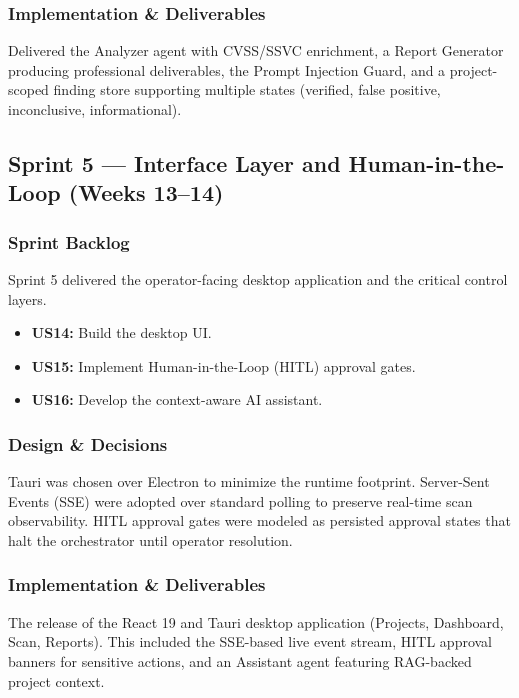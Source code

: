 \documentclass[12pt,a4paper]{report}
\begin{document}
\subsubsection{Implementation \& Deliverables}
Delivered the Analyzer agent with CVSS/SSVC enrichment, a Report Generator producing professional deliverables, the Prompt Injection Guard, and a project-scoped finding store supporting multiple states (verified, false positive, inconclusive, informational).

\subsection{Sprint 5 --- Interface Layer and Human-in-the-Loop (Weeks 13--14)}

\subsubsection{Sprint Backlog}
Sprint 5 delivered the operator-facing desktop application and the critical control layers.
\begin{itemize}
    \item \textbf{US14:} Build the desktop UI.
    \item \textbf{US15:} Implement Human-in-the-Loop (HITL) approval gates.
    \item \textbf{US16:} Develop the context-aware AI assistant.
\end{itemize}

\subsubsection{Design \& Decisions}
Tauri was chosen over Electron to minimize the runtime footprint. Server-Sent Events (SSE) were adopted over standard polling to preserve real-time scan observability. HITL approval gates were modeled as persisted approval states that halt the orchestrator until operator resolution.

\subsubsection{Implementation \& Deliverables}
The release of the React 19 and Tauri desktop application (Projects, Dashboard, Scan, Reports). This included the SSE-based live event stream, HITL approval banners for sensitive actions, and an Assistant agent featuring RAG-backed project context.

\end{document}
